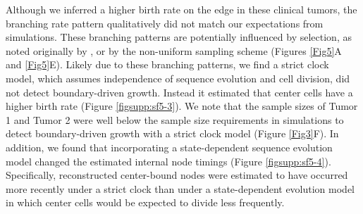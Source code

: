 \documentclass[12pt]{elife_based}
\begin{document}
Although we inferred a higher birth rate on the edge in these clinical tumors, the branching rate pattern qualitatively did not match our expectations from simulations. These branching patterns are potentially influenced by selection, as noted originally by \cite{Li2022}, or by the non-uniform sampling scheme (Figures \ref{Fig5}A and \ref{Fig5}E). Likely due to these branching patterns, we find a strict clock model, which assumes independence of sequence evolution and cell division, did not detect boundary-driven growth. Instead it estimated that center cells have a higher birth rate (Figure \ref{figsupp:sf5-3}). We note that the sample sizes of Tumor 1 and Tumor 2 were well below the sample size requirements in simulations to detect boundary-driven growth with a strict clock model (Figure \ref{Fig3}F). In addition, we found that incorporating a state-dependent sequence evolution model changed the estimated internal node timings (Figure \ref{figsupp:sf5-4}). Specifically, reconstructed center-bound nodes were estimated to have occurred more recently under a strict clock than under a state-dependent evolution model in which center cells would be expected to divide less frequently.
\end{document}
